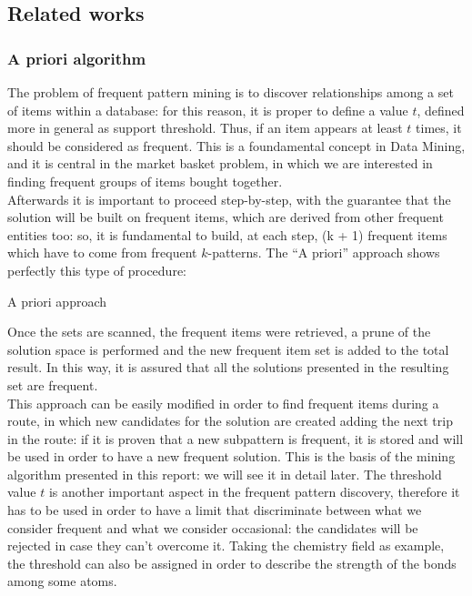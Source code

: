 \documentclass{acm_proc_article-sp-sigmod09}
\begin{document}
	\subsection{Related works}
	\subsubsection{A priori algorithm}
	The problem of frequent pattern mining is to discover relationships among a set of items within a database: for this reason, it is proper to define a value $t$, defined more in general as support threshold. Thus, if an item appears at least $t$ times, it should be considered as frequent. This is a foundamental concept in Data Mining, and it is central in the market basket problem, in which we are interested in finding frequent groups of items bought together.\\
	Afterwards it is important to proceed step-by-step, with the guarantee that the solution will be built on frequent items, which are derived from other frequent entities too: so, it is fundamental to build, at each step, (k + 1) frequent items which have to come from frequent $k$-patterns. The ``A priori'' approach shows perfectly this type of procedure:
\newcommand{\forcond}{$i=0$ \KwTo $n$}
	\begin{algorithm}[]
		\SetAlgoLined
		\caption{A priori approach}
	\end{algorithm}

	Once the sets are scanned, the frequent items were retrieved, a prune of the solution space is performed and the new frequent item set is added to the total result. In this way, it is assured that all the solutions presented in the resulting set are frequent.\\
	This approach can be easily modified in order to find frequent items during a route, in which new candidates for the solution are created adding the next trip in the route: if it is proven that a new subpattern is frequent, it is stored and will be used in order to have a new frequent solution. This is the basis of the mining algorithm presented in this report: we will see it in detail later.
	The threshold value $t$ is another important aspect in the frequent pattern discovery, therefore it has to be used in order to have a limit that discriminate between what we consider frequent and what we consider occasional: the candidates will be rejected in case they can’t overcome it. Taking the chemistry field as example, the threshold can also be assigned in order to describe the strength of the bonds among some atoms.
	
\end{document}

